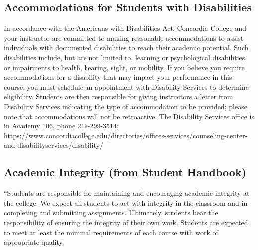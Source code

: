 \documentclass{tufte-handout}
\begin{document}
\begin{fullwidth}
\subsection{Accommodations for Students with Disabilities}

In accordance with the Americans with Disabilities Act, Concordia College and your instructor are committed to making reasonable accommodations to assist individuals with documented disabilities to reach their academic potential. Such disabilities include, but are not limited to, learning or psychological disabilities, or impairments to health, hearing, sight, or mobility. If you believe you require accommodations for a disability that may impact your performance in this course, you must schedule an appointment with Disability Services to determine eligibility. Students are then responsible for giving instructors a letter from Disability Services indicating the type of accommodation to be provided; please note that accommodations will not be retroactive. The Disability Services office is in Academy 106, phone 218-299-3514; https://www.concordiacollege.edu/directories/offices-services/counseling-center-and-disabilityservices/disability/ 

\end{fullwidth}

\subsection{Academic Integrity (from Student Handbook)}



``Students are responsible for maintaining and encouraging academic integrity at the college. We expect all students to act with integrity in the classroom and in completing and submitting assignments. Ultimately, students bear the responsibility of ensuring the integrity of their own work. Students are expected to meet at least the minimal requirements of each course with work of appropriate quality. 
\end{document}
